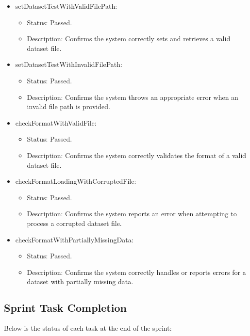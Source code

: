 \documentclass{scrreprt}
\begin{document}
\begin{itemize}
    \item setDatasetTestWithValidFilePath:
    \begin{itemize}
        \item Status: Passed.
        \item Description: Confirms the system correctly sets and retrieves a valid dataset file.
    \end{itemize}
    \item setDatasetTestWithInvalidFilePath:
    \begin{itemize}
        \item Status: Passed.
        \item Description: Confirms the system throws an appropriate error when an invalid file path is provided.
    \end{itemize}
    \item checkFormatWithValidFile:
    \begin{itemize}
        \item Status: Passed.
        \item Description: Confirms the system correctly validates the format of a valid dataset file.
    \end{itemize}
    \item checkFormatLoadingWithCorruptedFile:
    \begin{itemize}
        \item Status: Passed.
        \item Description: Confirms the system reports an error when attempting to process a corrupted dataset file.
    \end{itemize}
    \item checkFormatWithPartiallyMissingData:
    \begin{itemize}
        \item Status: Passed.
        \item Description: Confirms the system correctly handles or reports errors for a dataset with partially missing data.
    \end{itemize}
\end{itemize}

% 
\subsection{Sprint Task Completion}

Below is the status of each task at the end of the sprint:
\end{document}
